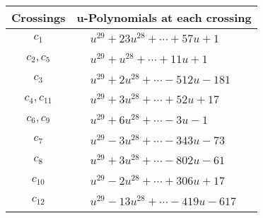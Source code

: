 \documentclass[1p]{elsarticle_modified}
\theoremstyle{definition}
\begin{document}
\begin{tabular}{m{50pt}|m{274pt}}
Crossings & \hspace{64pt}u-Polynomials at each crossing \\
\hline $$\begin{aligned}c_{1}\end{aligned}$$&$\begin{aligned}
&u^{29}+23 u^{28}+\cdots+57 u+1
\end{aligned}$\\
\hline $$\begin{aligned}c_{2},c_{5}\end{aligned}$$&$\begin{aligned}
&u^{29}+u^{28}+\cdots+11 u+1
\end{aligned}$\\
\hline $$\begin{aligned}c_{3}\end{aligned}$$&$\begin{aligned}
&u^{29}+2 u^{28}+\cdots-512 u-181
\end{aligned}$\\
\hline $$\begin{aligned}c_{4},c_{11}\end{aligned}$$&$\begin{aligned}
&u^{29}+3 u^{28}+\cdots+52 u+17
\end{aligned}$\\
\hline $$\begin{aligned}c_{6},c_{9}\end{aligned}$$&$\begin{aligned}
&u^{29}+6 u^{28}+\cdots-3 u-1
\end{aligned}$\\
\hline $$\begin{aligned}c_{7}\end{aligned}$$&$\begin{aligned}
&u^{29}-3 u^{28}+\cdots-343 u-73
\end{aligned}$\\
\hline $$\begin{aligned}c_{8}\end{aligned}$$&$\begin{aligned}
&u^{29}+3 u^{28}+\cdots-802 u-61
\end{aligned}$\\
\hline $$\begin{aligned}c_{10}\end{aligned}$$&$\begin{aligned}
&u^{29}-2 u^{28}+\cdots+306 u+17
\end{aligned}$\\
\hline $$\begin{aligned}c_{12}\end{aligned}$$&$\begin{aligned}
&u^{29}-13 u^{28}+\cdots-419 u-617
\end{aligned}$\\
\hline
\end{tabular}\\~\\
\end{document}

